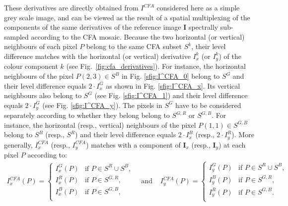 \documentclass[twoside]{article}
\begin{document}
\noindent These derivatives are directly obtained from $I^{CFA}$ considered here as a simple grey scale image, and can be viewed as the result of a spatial multiplexing of the components of the same derivatives of the reference image $\mathbf{I}$ spectrally sub-sampled according to the CFA mosaic.
Because the two horizontal (or vertical) neighbours of each pixel $P$ belong to the same CFA subset $S^k$, their level difference matches with the horizontal (or vertical) derivative $I^k_x$ (or $I^k_y$) of the colour component $k$ (see Fig.~\ref{fig:cfa_derivatives}). For instance, the horizontal neighbours of the pixel $P(2,3) \in S^B$ in Fig. \ref{sfig:I^CFA_0} belong to $S^G$ and their level difference equals $2 \cdot I^G_x$ as shown in Fig. \ref{sfig:I^CFA_x}. Its vertical neighbours also belong to $S^G$ (see Fig. \ref{sfig:I^CFA_1}) and their level difference equals $2 \cdot I^G_y$ (see Fig. \ref{sfig:I^CFA_y}). The pixels in $S^G$ have to be considered separately according to whether they belong belong to $S^{G,R}$ or $S^{G,B}$. For instance, the horizontal (resp., vertical) neighbours of the pixel $P(1,1) \in S^{G,B}$ belong to $S^B$ (resp., $S^R$) and their level difference equals  $2 \cdot I^B_x$ (resp.,  $2 \cdot I^R_y$). More generally, $I^{CFA}_x$ (resp., $I^{CFA}_y$) matches with a component of $\mathbf{I}_x$ (resp., $\mathbf{I}_y$) at each pixel $P$ according to:
\begin{equation}
	\begin{array}{lcl}
		I^{CFA}_x(P) = \left\lbrace
		\begin{array}{cl}
			I^G_x(P)  & \text{if $P \in S^R \cup S^B$,}\\ 
			I^R_x(P)  & \text{if $P \in S^{G,R}$,} \\
			I^B_x(P)  & \text{if $P \in S^{G,B}$,}\\
		\end{array}\right.
		& \text{ and } &
		I^{CFA}_y(P) = \left\lbrace
		\begin{array}{cl}
			I^G_y(P)  & \text{if $P \in S^R \cup S^B$,}\\ 
			I^B_y(P)  & \text{if $P \in S^{G,R}$,} \\
			I^R_y(P)  & \text{if $P \in S^{G,B}$.}\\
		\end{array}\right.
	\end{array}
\label{eq:cfa_derivatives}
\end{equation}
\end{document}
